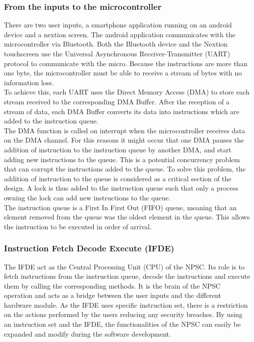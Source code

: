 \subsubsection{From the inputs to the microcontroller}
There are two user inputs, a smartphone application running on an android device and a nextion screen. The android application communicates with the microcontroller via Bluetooth. Both the Bluetooth device and the Nextion touchscreen use the Universal Asynchronous Receiver-Transmitter (UART) protocol to communicate with the micro. Because the instructions are more than one byte, the microcontroller must be able to receive a stream of bytes with no information loss.\\
To achieve this, each UART uses the Direct Memory Access (DMA) to store each stream received to the corresponding DMA Buffer. After the reception of a stream of data, each DMA Buffer converts its data into instructions which are added to the instruction queue.\\
The DMA function is called on interrupt when the microcontroller receives data on the DMA channel. For this reasons it might occur that one DMA pauses the addition of instruction to the instruction queue by another DMA, and start adding new instructions to the queue. This is a potential concurrency problem that can corrupt the instructions added to the queue. To solve this problem, the addition of instruction to the queue is considered as a critical section of the design. A lock is thus added to the instruction queue such that only a process owning the lock can add new instructions to the queue.\\
The instruction queue is a First In First Out (FIFO) queue, meaning that an element removed from the queue was the oldest element in the queue. This allows the instruction to be executed in order of arrival.

\subsubsection{Instruction Fetch Decode Execute (IFDE)}
The IFDE act as the Central Processing Unit (CPU) of the NPSC. Its role is to fetch instructions from the instruction queue, decode the instructions and execute them by calling the corresponding methods. It is the brain of the NPSC operation and acts as a bridge between the user inputs and the different hardware module. As the IFDE uses specific instruction set, there is a restriction on the actions performed by the users reducing any security breaches. By using an instruction set and the IFDE, the functionalities of the NPSC can easily be expanded and modify during the software development.
 

